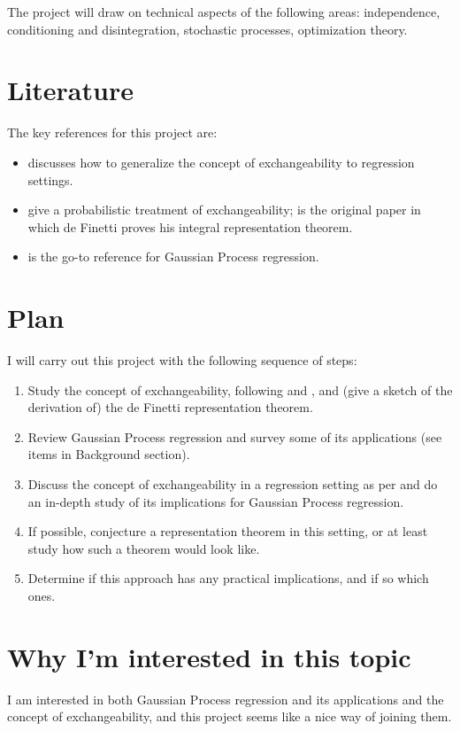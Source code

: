 \documentclass[]{STAT_547C}
\begin{document}
The project will draw on technical aspects of the following areas: independence, conditioning and disintegration, stochastic processes, optimization theory.


\section{Literature}

The key references for this project are:

\begin{itemize}
  \item \citet{McCullagh:2005:ExchAndReg} discusses how to generalize the concept of exchangeability to regression settings.
  \item \cite{Kingman:1978, Bernardo:1996:Exch} give a probabilistic treatment of exchangeability; \cite{deFinetti:1930:RepTheorem} is the original paper in which de Finetti proves his integral representation theorem.
  \item \cite{RasmussenWilliams:2006} is the go-to reference for Gaussian Process regression.
\end{itemize}


\section{Plan}

I will carry out this project with the following sequence of steps: 
\begin{enumerate}
  \item Study the concept of exchangeability, following \cite{Kingman:1978} and \cite{Bernardo:1996:Exch}, and (give a sketch of the derivation of) the de Finetti representation theorem.
  \item Review Gaussian Process regression and survey some of its applications (see items in Background section).
  \item Discuss the concept of exchangeability in a regression setting as per \cite{McCullagh:2005:ExchAndReg} and do an in-depth study of its implications for Gaussian Process regression. 
  \item If possible, conjecture a representation theorem in this setting, or at least study how such a theorem would look like.
  \item Determine if this approach has any practical implications, and if so which ones.
\end{enumerate}


\section{Why I'm interested in this topic}

I am interested in both Gaussian Process regression and its applications and the concept of exchangeability, and this project seems like a nice way of joining them.


\printbibliography
\end{document}

